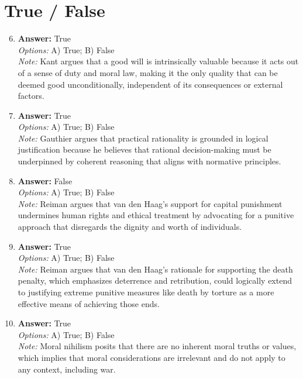 \documentclass[12pt]{article}
\begin{document}
\section*{True / False}
\begin{enumerate}[label=\arabic*.]
\setcounter{enumi}{5}
\item \textbf{Answer:} True
\\ \textit{Options:} A) True; B) False
\\ \textit{Note:} Kant argues that a good will is intrinsically valuable because it acts out of a sense of duty and moral law, making it the only quality that can be deemed good unconditionally, independent of its consequences or external factors.
\item \textbf{Answer:} True
\\ \textit{Options:} A) True; B) False
\\ \textit{Note:} Gauthier argues that practical rationality is grounded in logical justification because he believes that rational decision-making must be underpinned by coherent reasoning that aligns with normative principles.
\item \textbf{Answer:} False
\\ \textit{Options:} A) True; B) False
\\ \textit{Note:} Reiman argues that van den Haag's support for capital punishment undermines human rights and ethical treatment by advocating for a punitive approach that disregards the dignity and worth of individuals.
\item \textbf{Answer:} True
\\ \textit{Options:} A) True; B) False
\\ \textit{Note:} Reiman argues that van den Haag's rationale for supporting the death penalty, which emphasizes deterrence and retribution, could logically extend to justifying extreme punitive measures like death by torture as a more effective means of achieving those ends.
\item \textbf{Answer:} True
\\ \textit{Options:} A) True; B) False
\\ \textit{Note:} Moral nihilism posits that there are no inherent moral truths or values, which implies that moral considerations are irrelevant and do not apply to any context, including war.
\end{enumerate}
\end{document}
